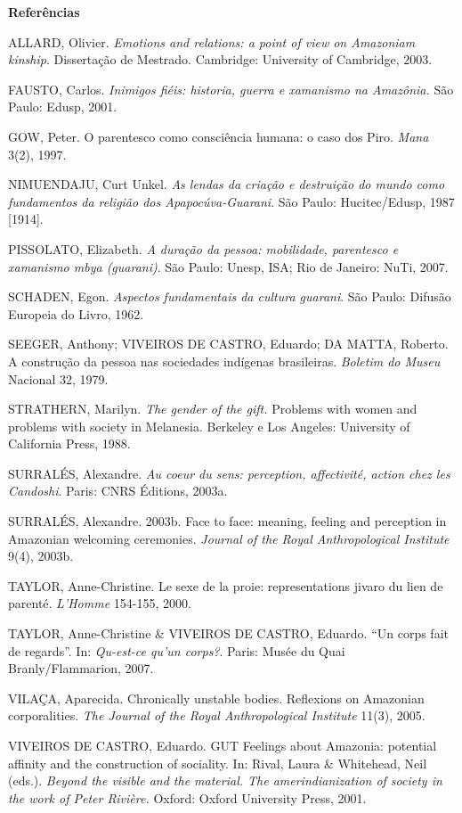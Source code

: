 \textbf{Referências }

ALLARD, Olivier. \emph{Emotions and relations: a point of view on
Amazoniam kinship}. Dissertação de Mestrado. Cambridge: University of
Cambridge, 2003.

FAUSTO, Carlos. \emph{Inimigos fiéis: historia, guerra e xamanismo na
Amazônia.} São Paulo: Edusp, 2001.

GOW, Peter. O parentesco como consciência humana: o caso dos Piro.
\emph{Mana} 3(2), 1997.

NIMUENDAJU, Curt Unkel. \emph{As lendas da criação e destruição do mundo
como fundamentos da religião dos Apapocúva-Guarani}. São Paulo:
Hucitec/Edusp, 1987 {[}1914{]}.

PISSOLATO, Elizabeth. \emph{A duração da pessoa: mobilidade, parentesco
e xamanismo mbya (guarani)}. São Paulo: Unesp, ISA; Rio de Janeiro:
NuTi, 2007.

SCHADEN, Egon. \emph{Aspectos fundamentais da cultura guarani}. São
Paulo: Difusão Europeia do Livro, 1962.

SEEGER, Anthony; VIVEIROS DE CASTRO, Eduardo; DA MATTA, Roberto. A
construção da pessoa nas sociedades indígenas brasileiras. \emph{Boletim
do Museu} Nacional 32, 1979.

STRATHERN, Marilyn. \emph{The gender of the gift.} Problems with women
and problems with society in Melanesia. Berkeley e Los Angeles:
University of California Press, 1988.

SURRALÉS, Alexandre. \emph{Au coeur du sens: perception, affectivité,
action chez les Candoshi}. Paris: CNRS Éditions, 2003a.

SURRALÉS, Alexandre. 2003b. Face to face: meaning, feeling and
perception in Amazonian welcoming ceremonies. \emph{Journal of the Royal
Anthropological Institute} 9(4), 2003b.

TAYLOR, Anne-Christine. Le sexe de la proie: representations jivaro du
lien de parenté. \emph{L'Homme} 154-155, 2000.

TAYLOR, Anne-Christine \& VIVEIROS DE CASTRO, Eduardo. ``Un corps fait
de regards''. In: \emph{Qu-est-ce qu'un corps?}. Paris: Musée du Quai
Branly/Flammarion, 2007.

VILAÇA, Aparecida. Chronically unstable bodies. Reflexions on Amazonian
corporalities. \emph{The Journal of the Royal Anthropological Institute}
11(3), 2005.

VIVEIROS DE CASTRO, Eduardo. GUT Feelings about Amazonia: potential
affinity and the construction of sociality. In: Rival, Laura \&
Whitehead, Neil (eds.). \emph{Beyond the visible and the material. The
amerindianization of society in the work of Peter Rivière.} Oxford:
Oxford University Press, 2001.

